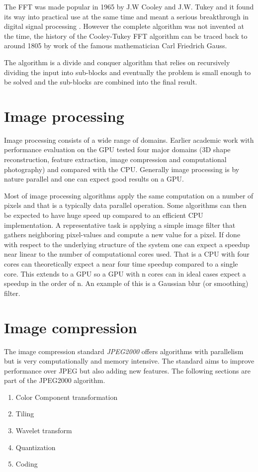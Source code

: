 The FFT was made popular in 1965\cite{cooley1965algorithm} by J.W Cooley and J.W. Tukey and it found its way into practical use at the same time and meant a serious breakthrough in digital signal processing \cite{cooley1969fast, brigham1967fast}. However the complete algorithm was not invented at the time, the history of the Cooley-Tukey \gls{FFT} algorithm can be traced back to around 1805 by work of the famous mathematician Carl Friedrich Gauss\cite{heideman1984gauss}.

The algorithm is a divide and conquer algorithm that relies on recursively dividing the input into sub-blocks and eventually the problem is small enough to be solved and the sub-blocks are combined into the final result.
\section{Image processing}
Image processing consists of a wide range of domains. Earlier academic work with performance evaluation on the \gls{GPU}\cite{park2011design} tested four major domains (\gls{3D} shape reconstruction, feature extraction, image compression and computational photography) and compared with the \gls{CPU}. Generally image processing is by nature parallel and one can expect good results on a \gls{GPU}.

Most of image processing algorithms apply the same computation on a number of pixels and that is a typically data parallel operation. Some algorithms can then be expected to have huge speed up compared to an efficient \gls{CPU} implementation. A representative task is applying a simple image filter that gathers neighboring pixel-values and compute a new value for a pixel. If done with respect to the underlying structure of the system one can expect a speedup near linear to the number of computational cores used. That is a \gls{CPU} with four cores can theoretically expect a near four time speedup compared to a single core. This extends to a \gls{GPU} so a \gls{GPU} with n cores can in ideal cases expect a speedup in the order of n. An example of this is a Gaussian blur (or smoothing) filter.

\section{Image compression}
The image compression standard \emph{JPEG2000} offers algorithms with parallelism but is very computationally and memory intensive. The standard aims to improve performance over JPEG but also adding new features. The following sections are part of the JPEG2000 algorithm\cite{christopoulos2000jpeg2000}.
\begin{enumerate}
	\item Color Component transformation
	\item Tiling
	\item Wavelet transform
	\item Quantization
	\item Coding
\end{enumerate}

